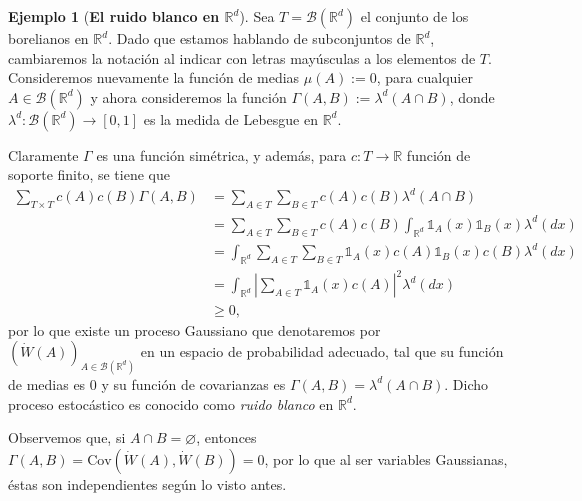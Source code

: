\documentclass[letterpaper,twoside,12pt]{book}
\newcommand{\R}{\mathbb{R}}
\newcommand{\B}{\mathcal{B}}
\newcommand{\W}{\dot{W}}
\newcommand{\1}{\mathds{1}}
\newcommand{\abs}[1]{\left\lvert #1 \right\rvert}
\renewcommand{\to}{\rightarrow}
\theoremstyle{definition}
\theoremstyle{definition}
\theoremstyle{remark}
\theoremstyle{definition}
\theoremstyle{definition}
\theoremstyle{definition}
\theoremstyle{definition}
\newtheorem{ejem}{Ejemplo}
\theoremstyle{definition}
\begin{document}
\begin{ejem}[\textbf{El ruido blanco en $\R^{d}$}] 
Sea $T=\B(\R^{d})$ el conjunto de los borelianos en $\R^d$.
Dado que estamos hablando de subconjuntos de $\R^{d}$, cambiaremos la notación al indicar con letras mayúsculas a los elementos de $T$.
Consideremos nuevamente la función de medias $\mu(A):=0$, para cualquier $A\in \B(\R^{d})$ y ahora consideremos la función $\Gamma(A,B):=\lambda^{d}(A\cap B)$, donde $\lambda^{d}:\B(\R^{d})\to [0,1]$ es la medida de Lebesgue en $\R^{d}$.

 Claramente $\Gamma$ es una función simétrica, y además, para $c:T\to\R$ función de soporte finito, se tiene que 
 \begin{align*}
    \sum_{T\times T}^{}c(A)c(B)\Gamma(A,B)&=\sum_{A\in T}^{}\sum_{B\in T}c(A)c(B)\lambda^{d}(A\cap B)\\
    &=\sum_{A\in T}^{}\sum_{B\in T}c(A)c(B)\int_{\R^d}\1_{A}(x)\1_{B}(x)\lambda^{d}(dx)\\
    &=\int_{\R^{d}}\sum_{A\in T}\sum_{B\in T}\1_{A}(x)c(A)\1_{B}(x)c(B)\lambda^{d}(dx)\\
    &=\int_{\R^{d}}\abs{\sum_{A\in T}\1_{A}(x)c(A)}^2\lambda^{d}(dx)\\
    &\geq0,
    \end{align*}
por lo que existe un proceso Gaussiano que denotaremos por $(\dot{W}(A))_{A\in \B(\R^{d})}$ en un espacio de probabilidad adecuado, tal que su función de medias es $0$ y su función de covarianzas es $\Gamma(A,B)=\lambda^{d}(A\cap B)$. Dicho proceso estocástico es conocido como \textit{ruido blanco} en $\R^{d}$.

Observemos que, si $A\cap B=\varnothing$, entonces $\Gamma(A,B)=\text{Cov}\left(\W(A),\W(B)\right)=0$, por lo que al ser variables Gaussianas, éstas son independientes según lo visto antes.


\end{ejem}
\end{document}
